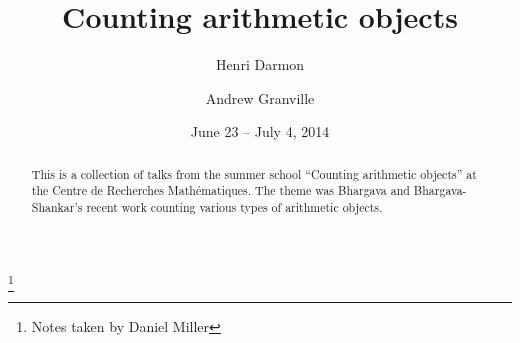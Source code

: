 \documentclass[english,letterpaper]{smfart}
\author{Henri Darmon}
\author{Andrew Granville}
\title{Counting arithmetic objects}
\date{June 23 -- July 4, 2014}
\begin{document}
\frontmatter

\begin{abstract}
This is a collection of talks from the summer school ``Counting arithmetic 
objects'' at the Centre de Recherches Math\'ematiques. The theme was Bhargava 
and Bhargava-Shankar's recent work counting various types of arithmetic 
objects.  
\end{abstract}

\thanks{Notes taken by Daniel Miller}

\maketitle
\tableofcontents
\mainmatter































\backmatter


\end{document}
